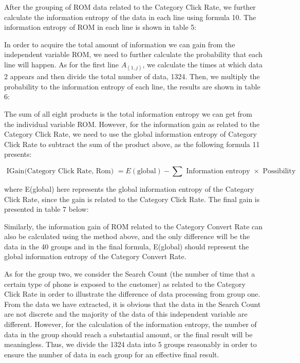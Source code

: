 After the grouping of ROM data related to the Category Click Rate, we further calculate the information entropy of the data in each line using formula 10. The information entropy of ROM in each line is shown in table 5:

In order to acquire the total amount of information we can gain from the independent variable ROM, we need to further calculate the probability that each line will happen. As for the first line $A_(1,j)$, we calculate the times at which data 2 appears and then divide the total number of data, 1324. Then, we multiply the probability to the information entropy of each line, the results are shown in table 6: 

The sum of all eight products is the total information entropy we can get from the individual variable ROM. However, for the information gain as related to the 
Category Click Rate, we need to use the global information entropy of Category Click Rate to subtract the sum of the product above, as the following formula 11 presents:

\begin{equation}\label{key}
{ \text { IGain(Category Click Rate, Rom) } }  { = E ( \text {global} ) - \sum \text { Information entropy } \times \text { Possibility } } 
\end{equation}

where E(global) here represents the global information entropy of the Category Click Rate, since the gain is related to the Category Click Rate. The final gain is presented in table 7 below:

Similarly, the information gain of ROM related to the Category Convert Rate can also be calculated using the method above, and the only difference will be the data in the 40 groups and in the final formula, E(global) should represent the global information entropy of the Category Convert Rate.

As for the group two, we consider the Search Count (the number of time that a certain type of phone is exposed to the customer) as related to the Category Click Rate in order to illustrate the difference of data processing from group one. From the data we have extracted, it is obvious that the data in the Search Count are not discrete and the majority of the data of this independent variable are different. However, for the calculation of the information entropy, the number of data in the group should reach a substantial amount, or the final result will be meaningless. Thus, we divide the 1324 data into 5 groups reasonably in order to ensure the number of data in each group for an effective final result.

